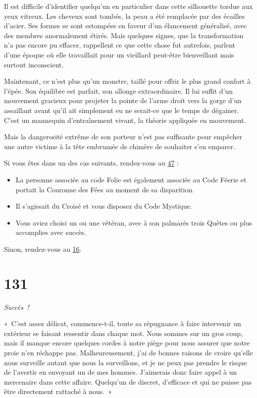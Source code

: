 \documentclass{report}
\newcommand{\gsection}[1]{
    \section{#1}
    \label{section-#1}
}
\newcommand{\glink}[1]{\hyperref[section-#1]{#1}}
\newcommand{\success}{\emph{Succès !}}
\begin{document}
Il est difficile d'identifier quelqu'un en particulier dans cette silhouette tordue aux yeux vitreux. Les cheveux sont tombés, la peau a été remplacée par des écailles d'acier. Ses formes se sont estompées en faveur d'un élancement généralisé, avec des membres anormalement étirés. Mais quelques signes, que la transformation n'a pas encore pu effacer, rappellent ce que cette chose fut autrefois, parlent d'une époque où elle travaillait pour un vieillard peut-être bienveillant mais surtout inconscient.

Maintenant, ce n'est plus qu'un monstre, taillé pour offrir le plus grand confort à l'épée. Son équilibre est parfait, son allonge extraordinaire. Il lui suffit d'un mouvement gracieux pour projeter la pointe de l'arme droit vers la gorge d'un assaillant avant qu'il ait simplement eu ne serait-ce que le temps de dégainer. C'est un mannequin d'entraînement vivant, la théorie appliquée en mouvement.

Mais la dangerosité extrême de son porteur n'est pas suffisante pour empêcher une autre victime à la tête embrumée de chimère de souhaiter s'en emparer.

Si vous êtes dans un des cas suivants, rendez-vous au \glink{47} :

\begin{itemize}
\item La personne associée au code Folie est également associée au Code Féerie et portait la Couronne des Fées au moment de sa disparition.
\item Il s'agissait du Croisé et vous disposez du Code Mystique.
\item Vous aviez choisi un ou une vétéran, avec à son palmarès trois Quêtes ou plus accomplies avec succès.
\end{itemize}

Sinon, rendez-vous au \glink{16}.

\gsection{131}

\success

« C'est assez délicat, commence-t-il, toute sa répugnance à faire intervenir un extérieur se faisant ressentir dans chaque mot. Nous sommes sur un gros coup, mais il manque encore quelques cordes à notre piège pour nous assurer que notre proie n'en réchappe pas. Malheureusement, j'ai de bonnes raisons de croire qu'elle nous surveille autant que nous la surveillons, et je ne peux pas prendre le risque de l'avertir en envoyant un de mes hommes. J'aimerais donc faire appel à un mercenaire dans cette affaire. Quelqu'un de discret, d'efficace et qui ne puisse pas être directement rattaché à nous. »
\end{document}
